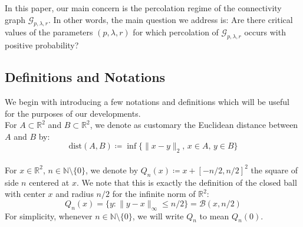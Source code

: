 \documentclass[10pt,a4paper]{amsart}
\theoremstyle{exampstyle}
\newtheorem{Remark}{Remark}
\theoremstyle{exampnotations}
\begin{document}

\indent In this paper, our main concern is the percolation regime of the connectivity graph $\mathcal{G}_{p,\lambda,r}$. In other words, the main question we address is: Are there critical values of the parameters $(p,\lambda,r)$ for which percolation of $\mathcal{G}_{p,\lambda,r}$ occurs with positive probability?


\subsection{Definitions and Notations}
We begin with introducing a few notations and definitions which will be useful for the purposes of our developments. \\


\indent For $A \subset \mathbb{R}^{2}$ and $B \subset \mathbb{R}^{2}$, we denote as customary the Euclidean distance between $A$ and $B$ by:
 $$\text{dist}(A,B) \coloneqq \inf \lbrace \lVert x - y \rVert_{2} , \,  x \in A, \,  y \in B \rbrace$$
\\

\indent For $x \in \mathbb{R}^{2}$, $n \in \mathbb{N} \setminus \lbrace 0 \rbrace$, we denote by $Q_n(x) \coloneqq x + \left[-n/2,n/2\right]^{2}$ the square of side $n$ centered at $x$. We note that this is exactly the definition of the closed ball with center $x$ and radius $n/2$ for the infinite norm of $\mathbb{R}^2$:
\begin{equation*}
    Q_n(x) = \lbrace y : \lVert y-x \rVert_{\infty} \leq n/2 \rbrace = \mathscr{B}(x,n/2)
\end{equation*}
For simplicity, whenever $n \in \mathbb{N} \setminus \lbrace 0 \rbrace$, we will write $Q_n$ to mean $Q_n(0)$. \\
\end{document}
